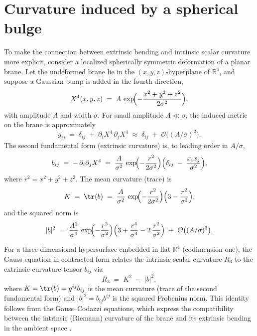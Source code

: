 \section{Curvature induced by a spherical bulge}
\label{app:bulge-curvature}

To make the connection between extrinsic bending and intrinsic scalar
curvature more explicit, consider a localized spherically symmetric
deformation of a planar brane. Let the undeformed brane lie in the
$(x,y,z)$-hyperplane of $\mathbb{R}^4$, and suppose a Gaussian bump
is added in the fourth direction,
\begin{equation}
X^4(x,y,z) \;=\; A\,\exp\!\Bigl(-\frac{x^2+y^2+z^2}{2\sigma^2}\Bigr),
\label{eq:gaussian-bulge}
\end{equation}
with amplitude $A$ and width $\sigma$. For small amplitude
$A\ll\sigma$, the induced metric on the brane is approximately
\begin{equation}
g_{ij} \;=\; \delta_{ij} \;+\; \partial_i X^4\,\partial_j X^4
\;\approx\; \delta_{ij} \;+\; \mathcal{O}\bigl((A/\sigma)^2\bigr).
\end{equation}
The second fundamental form (extrinsic curvature) is, to leading
order in $A/\sigma$,
\begin{equation}
b_{ij} \;=\; -\,\partial_i\partial_j X^4
\;=\; \frac{A}{\sigma^2}\,\exp\!\Bigl(-\frac{r^2}{2\sigma^2}\Bigr)
\Bigl(\delta_{ij} \;-\; \frac{x_i x_j}{\sigma^2}\Bigr),
\end{equation}
where $r^2=x^2+y^2+z^2$. The mean curvature (trace) is
\begin{equation}
K \;=\; \tr(b)
\;=\; \frac{A}{\sigma^2}\,\exp\!\Bigl(-\frac{r^2}{2\sigma^2}\Bigr)
\Bigl(3 - \frac{r^2}{\sigma^2}\Bigr),
\end{equation}
and the squared norm is
\begin{equation}
|b|^2 \;=\; \frac{A^2}{\sigma^4}\,\exp\!\Bigl(-\frac{r^2}{\sigma^2}\Bigr)
\Bigl(3 + \frac{r^4}{\sigma^4} - 2\,\frac{r^2}{\sigma^2}\Bigr)
\;+\; \mathcal{O}\bigl((A/\sigma)^3\bigr).
\end{equation}

For a three-dimensional hypersurface embedded in flat $\mathbb{R}^4$ (codimension one), the Gauss equation in contracted form relates the intrinsic scalar curvature $R_3$ to the extrinsic curvature tensor $b_{ij}$ via
\begin{equation}
R_3 \;=\; K^2 \;-\; |b|^2,
\label{eq:gauss-codazzi-3d}
\end{equation}
where $K = \tr(b) = g^{ij}b_{ij}$ is the mean curvature (trace of the second fundamental form) and $|b|^2 = b_{ij}b^{ij}$ is the squared Frobenius norm. This identity follows from the Gauss--Codazzi equations, which express the compatibility between the intrinsic (Riemann) curvature of the brane and its extrinsic bending in the ambient space \cite{DoCarmo1992}.

